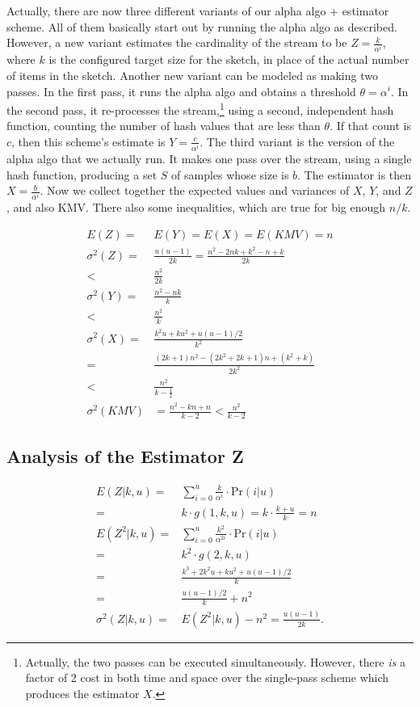 \documentclass{sig-alternate}
\begin{document}
Actually, there are now three different variants of our alpha algo + estimator scheme.
All of them basically start out by running the alpha algo as described. However, a new variant
estimates the cardinality of the stream to be $Z = \frac{k}{\alpha^i}$, where $k$ is the configured
target size for the sketch, in place of the actual number of items in the sketch. Another new variant
can be modeled as making two passes. In the first pass, it runs the alpha algo and obtains a threshold
$\theta = \alpha^i$. In the second pass, it re-processes the stream,\footnote{Actually, the two passes can be
executed simultaneously. However, there {\em is} a factor of 2 cost in both time and space over the single-pass scheme
which produces the estimator $X$.} using a second, independent hash function, counting the number of hash values that are less than $\theta$. If that count is
$c$, then this scheme's estimate is $Y = \frac{c}{\alpha^i}$.  The third variant is the version of the alpha algo that we actually run. 
It makes one pass over the stream, using a single hash function, producing a set $S$ of samples whose size is $b$. The estimator is then
$X = \frac{b}{\alpha^i}$.  Now we collect together the expected values and variances of $X$, $Y$, and $Z$, and also KMV. There also some
inequalities, which are true for big enough $n/k$.

\begin{align}
E(Z) = & E(Y) = E(X) = E(KMV) = n \\
\sigma^2(Z) = & \frac{u(u-1)}{2k} = \frac{n^2-2nk+k^2-n+k}{2k} \\
   < & \frac{n^2}{2k} \\
\sigma^2(Y) = & \frac{n^2-nk}{k} \\ 
            < & \frac{n^2}{k} \\
\sigma^2(X) = & \frac{k^2u + ku^2 + u(u\!-\!1)/2}{k^2} \\
            = & \frac{(2k+1)n^2 - (2k^2+2k+1)n + (k^2+k)}{2k^2} \\
            < & \frac{n^2}{k-\frac{1}{2}} \\
\sigma^2(KMV) & = \frac{n^2 - kn + n}{k-2} < \frac{n^2}{k-2}
\end{align}

\subsection{Analysis of the Estimator Z}

\begin{align}
 E(Z|k,u)  = & \sum_{i=0}^{u}\frac{k}{\alpha^i} \cdot \mathrm{Pr}(i|u) \\
  = & k \cdot g(1,k,u) = k\cdot\frac{k+u}{k} = n \\
 E(Z^2|k,u) = & \sum_{i=0}^{u}\frac{k^2}{\alpha^{2i}} \cdot \mathrm{Pr}(i|u) \\
  = & k^2 \cdot g(2,k,u) \\
  = & \frac{k^3 + 2k^2u + ku^2 + u(u-1)/2}{k} \\
  = & \frac{u(u-1)/2}{k} + n^2 \\
 \sigma^2(Z|k,u) = & E(Z^2|k,u) - n^2 = \frac{u(u-1)}{2k}.
\end{align}
\end{document}
